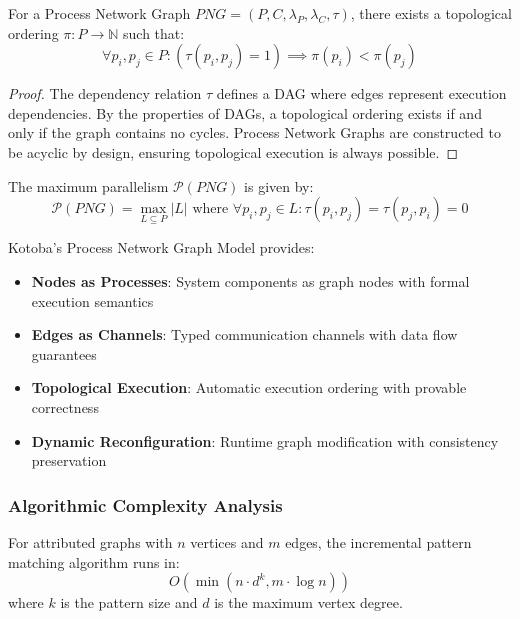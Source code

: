 \documentclass[11pt,a4paper]{article}
\begin{document}
\begin{theorem}
For a Process Network Graph $PNG = (P, C, \lambda_P, \lambda_C, \tau)$, there exists a topological ordering $\pi: P \rightarrow \mathbb{N}$ such that:
\[
\forall p_i, p_j \in P: (\tau(p_i, p_j) = 1) \implies \pi(p_i) < \pi(p_j)
\]
\end{theorem}

\begin{proof}
The dependency relation $\tau$ defines a DAG where edges represent execution dependencies. By the properties of DAGs, a topological ordering exists if and only if the graph contains no cycles. Process Network Graphs are constructed to be acyclic by design, ensuring topological execution is always possible.
\end{proof}

\begin{lemma}
The maximum parallelism $\mathcal{P}(PNG)$ is given by:
\[
\mathcal{P}(PNG) = \max_{L \subseteq P} |L| \text{ where } \forall p_i, p_j \in L: \tau(p_i, p_j) = \tau(p_j, p_i) = 0
\]
\end{lemma}

Kotoba's Process Network Graph Model provides:

\begin{itemize}
\item \textbf{Nodes as Processes}: System components as graph nodes with formal execution semantics
\item \textbf{Edges as Channels}: Typed communication channels with data flow guarantees
\item \textbf{Topological Execution}: Automatic execution ordering with provable correctness
\item \textbf{Dynamic Reconfiguration}: Runtime graph modification with consistency preservation
\end{itemize}

\subsubsection{Algorithmic Complexity Analysis}
\label{subsubsec:complexity}

\begin{theorem}
For attributed graphs with $n$ vertices and $m$ edges, the incremental pattern matching algorithm runs in:
\[
O\left(\min\left(n \cdot d^k, m \cdot \log n\right)\right)
\]
where $k$ is the pattern size and $d$ is the maximum vertex degree.
\end{theorem}
\end{document}
